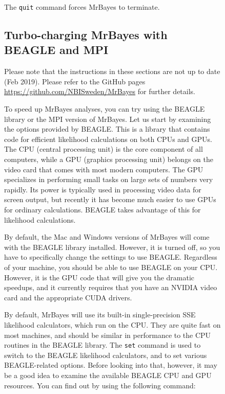 \documentclass[12pt]{book}
\newcommand{\ttt}[1]{\texttt{#1}}
\begin{document}
\begin{figure}[h]
The \ttt{quit} command forces MrBayes to terminate.


\subsection{Turbo-charging MrBayes with BEAGLE and MPI}

\vspace{5 pt}
{\large Please note that the instructions in these sections are not up to date
(Feb 2019). Please refer to the GitHub pages \url{https://github.com/NBISweden/MrBayes}
for further details.}
\vspace{5 pt}

To speed up MrBayes analyses, you can try using the BEAGLE library or the MPI version of MrBayes.
Let us start by examining the options provided by BEAGLE. This is a library that contains code for
efficient likelihood calculations on both CPUs and GPUs. The CPU (central processing unit) is the
core component of all computers, while a GPU (graphics processing unit) belongs on the video card
that comes with most modern computers. The GPU specializes in performing small tasks on large sets
of numbers very rapidly. Its power is typically used in processing video data for screen output,
but recently it has become much easier to use GPUs for ordinary calculations. BEAGLE takes
advantage of this for likelihood calculations.

By default, the Mac and Windows versions of MrBayes will come with the BEAGLE library installed.
However, it is turned off, so you have to specifically change the settings to use BEAGLE.
Regardless of your machine, you should be able to use BEAGLE on your CPU. However, it is the GPU
code that will give you the dramatic speedups, and it currently requires that you have an NVIDIA
video card and the appropriate CUDA drivers.

By default, MrBayes will use its built-in single-precision SSE likelihood calculators, which run on
the CPU. They are quite fast on most machines, and should be similar in performance to the CPU
routines in the BEAGLE library. The \ttt{set} command is used to switch to the BEAGLE likelihood
calculators, and to set various BEAGLE-related options. Before looking into that, however, it may
be a good idea to examine the available BEAGLE CPU and GPU resources. You can find out by using the
following command:


\end{figure}
\end{document}
